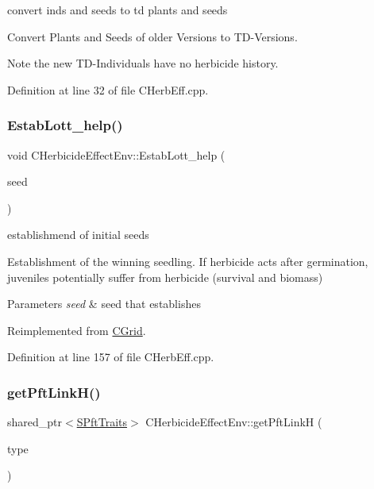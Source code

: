 convert inds and seeds to td plants and seeds 

Convert Plants and Seeds of older Versions to T\+D-\/\+Versions. \begin{DoxyNote}{Note}
the new T\+D-\/\+Individuals have no herbicide history. 
\end{DoxyNote}


Definition at line 32 of file C\+Herb\+Eff.\+cpp.

\mbox{\label{class_c_herbicide_effect_env_a6c75efbe3b28138bbe417e52d5a3f523}} 
\subsubsection{\texorpdfstring{EstabLott\_help()}{EstabLott\_help()}}
{\footnotesize\ttfamily void C\+Herbicide\+Effect\+Env\+::\+Estab\+Lott\+\_\+help (\begin{DoxyParamCaption}\item[{\mbox{\hyperlink{class_c_seed}{C\+Seed}} $\ast$}]{seed }\end{DoxyParamCaption})\hspace{0.3cm}{\ttfamily [virtual]}}



establishmend of initial seeds 

Establishment of the winning seedling. If herbicide acts after germination, juveniles potentially suffer from herbicide (survival and biomass)


\begin{DoxyParams}{Parameters}
{\em seed} & seed that establishes \\
\hline
\end{DoxyParams}


Reimplemented from \mbox{\hyperlink{class_c_grid_a9cf3315cee571708d8b2db65611eb324}{C\+Grid}}.



Definition at line 157 of file C\+Herb\+Eff.\+cpp.

\mbox{\label{class_c_herbicide_effect_env_a8377e1b8408118491b7822e92c1bf87e}} 
\subsubsection{\texorpdfstring{getPftLinkH()}{getPftLinkH()}}
{\footnotesize\ttfamily shared\+\_\+ptr$<$\mbox{\hyperlink{class_s_pft_traits}{S\+Pft\+Traits}}$>$ C\+Herbicide\+Effect\+Env\+::get\+Pft\+LinkH (\begin{DoxyParamCaption}\item[{string}]{type }\end{DoxyParamCaption})\hspace{0.3cm}{\ttfamily [inline]}}



